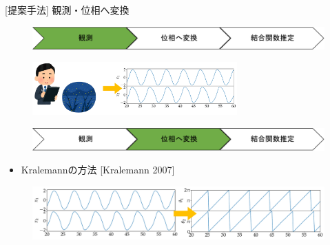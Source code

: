 \begin{frame}[t]{[提案手法] 観測・位相へ変換}
\begin{figure}
  \centering
  \includegraphics[width=\textwidth]{figs/flowchart1.pdf}
\end{figure}
\begin{figure}
  \centering
  \includegraphics[width=0.7\textwidth]{figs/observe_ponchi.pdf}
\end{figure}
\begin{figure}
  \centering
  \includegraphics[width=\textwidth]{figs/flowchart2.pdf}
\end{figure}
\begin{itemize}
  \item Kralemannの方法 [Kralemann 2007]
\end{itemize}
\begin{figure}
  \centering
  \includegraphics[width=\textwidth]{figs/data_to_phase.pdf}
\end{figure}
\end{frame}


